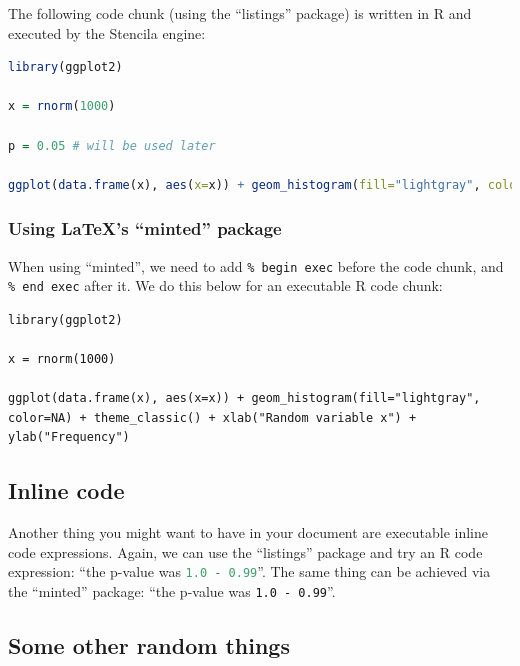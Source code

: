 \documentclass[12pt]{article}
\begin{document}
The following code chunk (using the ``listings'' package) is written
in R and executed by the Stencila engine:\\

\begin{lstlisting}[language=R, breaklines=true, showspaces=false,
  showstringspaces=false, tabsize=4, captionpos=b, frame=single,
  caption={Histogram of 1,000 random draws from $\mathcal{N}$(0.0, 1.0).}]
library(ggplot2)
  
x = rnorm(1000)

p = 0.05 # will be used later

ggplot(data.frame(x), aes(x=x)) + geom_histogram(fill="lightgray", color=NA) + theme_classic() + xlab("Random variable x") + ylab("Frequency")
\end{lstlisting}

\subsubsection*{Using \LaTeX 's ``minted'' package}

When using ``minted'', we need to add \texttt{\% begin
  exec} before the code chunk, and \texttt{\% end
  exec} after it.
We do this below for an executable R code chunk:

\begin{verbatim}
library(ggplot2)
  
x = rnorm(1000)

ggplot(data.frame(x), aes(x=x)) + geom_histogram(fill="lightgray", color=NA) + theme_classic() + xlab("Random variable x") + ylab("Frequency")
\end{verbatim}

\subsection*{Inline code}

Another thing you might want to have in your document are executable
inline code expressions.
Again, we can use the ``listings'' package and try an R code
expression: ``the p-value was \lstinline[language=R]{1.0 - 0.99}''.
The same thing can be achieved via the ``minted'' package: ``the
p-value was \texttt{1.0 - 0.99}''.

\subsection*{Some other random things}
\end{document}

